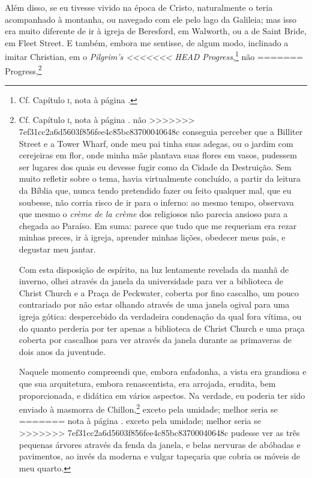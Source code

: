 {{{{{{{{{{{{{{{{{{{{{{{{{{{{{{{{{{{{{{{{{{{{{{{{{{{{{{{{{{{{{{{{{{{{{{{{{{{{{{{{{{{{{{{{%
Além disso, se eu tivesse vivido na época de Cristo, naturalmente o
teria acompanhado à montanha, ou navegado com ele pelo lago da Galileia;
mas isso era muito diferente de ir à igreja de Beresford, em Walworth,
ou a de Saint Bride, em Fleet Street. E também, embora me sentisse, de
algum modo, inclinado a imitar Christian, em o \textit{Pilgrim's
<<<<<<< HEAD
Progress},\footnote{Cf. Capítulo \textsc{i}, nota à página \pageref{peregrino}.} não
=======
Progress},\footnote{Cf. Capítulo \textsc{i}, nota à página \pageref{peregrino}.  não
>>>>>>> 7ef31cc2a6d5603f856fee4c85bc83700040648c
conseguia perceber que a Billiter Street e a Tower Wharf, onde meu pai
tinha suas adegas, ou o jardim com cerejeiras em flor, onde minha mãe
plantava suas flores em vasos, pudessem ser lugares dos quais eu devesse
fugir como da Cidade da Destruição. Sem muito refletir sobre o tema,
havia virtualmente concluído, a partir da leitura da Bíblia que, nunca
tendo pretendido fazer ou feito qualquer mal, que eu soubesse, não
corria risco de ir para o inferno: ao mesmo tempo, observava que mesmo o
\textit{crème de la crème} dos religiosos não parecia ansioso para a
chegada ao Paraíso. Em suma: parece que tudo que me requeriam era rezar
minhas preces, ir à igreja, aprender minhas lições, obedecer meus pais,
e degustar meu jantar.

Com esta disposição de espírito, na luz lentamente revelada da
manhã de inverno, olhei através da janela da universidade para ver a
biblioteca de Christ Church e a Praça de Peckwater, coberta por fino
cascalho, um pouco contrariado por não estar olhando através de uma
janela ogival para uma igreja gótica: despercebido da verdadeira
condenação da qual fora vítima, ou do quanto perderia por ter apenas a
biblioteca de Christ Church e uma praça coberta por cascalhos para ver
através da janela durante as primaveras de dois anos da juventude.

Naquele momento compreendi que, embora enfadonha, a vista era grandiosa
e que sua arquitetura, embora renascentista, era arrojada, erudita, bem
proporcionada, e didática em vários aspectos. Na verdade, eu poderia ter
sido enviado à masmorra de Chillon,\footnote{Cf. Capítulo \textsc{viii},
<<<<<<< HEAD
  nota à página \pageref{chillon}.} exceto pela umidade; melhor seria se
=======
  nota à página \pageref{chillon}.  exceto pela umidade; melhor seria se
>>>>>>> 7ef31cc2a6d5603f856fee4c85bc83700040648c
pudesse ver as três pequenas árvores através da fenda da janela, e belas
nervuras de abóbadas e pavimentos, ao invés da moderna e vulgar
tapeçaria que cobria os móveis de meu quarto.

}}}}}}}}}}}}}}}}}}}}}}}}}}}}}}}}}}}}}}}}}}}}}}}}}}}}}}}}}}}}}}}}}}}}}}}}}}}}}}}}}}}}}}}}
